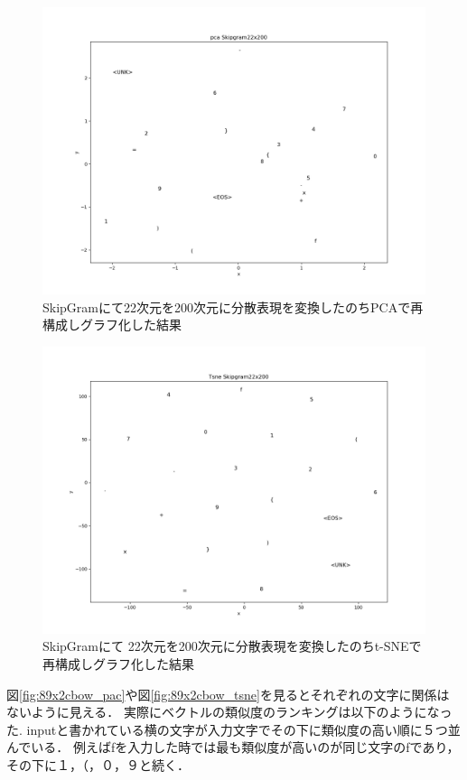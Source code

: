 \documentclass[a4j,11pt,report]{jsbook}
\begin{document}
\begin{center}
  \begin{figure}[H]
    \centering
    \includegraphics[width=0.8\linewidth]{image/pca_skipgram.png}
    \caption{SkipGramにて22次元を200次元に分散表現を変換したのちPCAで再構成しグラフ化した結果}
    \label{fig:22x2_skippca}
  \end{figure}
\end{center}


\begin{center}
  \begin{figure}[H]
    \centering
    \includegraphics[width=0.8\linewidth]{image/tsne_skipgram.png}
    \caption{SkipGramにて 22次元を200次元に分散表現を変換したのちt-SNEで再構成しグラフ化した結果}
    \label{fig:22x2skip_tsne}
  \end{figure}
\end{center}

図\ref{fig:89x2cbow_pac}や図\ref{fig:89x2cbow_tsne}を見るとそれぞれの文字に関係はないように見える．
実際にベクトルの類似度のランキングは以下のようになった.
inputと書かれている横の文字が入力文字でその下に類似度の高い順に５つ並んでいる．
例えばfを入力した時では最も類似度が高いのが同じ文字のfであり，その下に１，（，０，９と続く．
\begin{multicols}{2}
  \begin{quote}
  \end{quote}
\end{multicols}
\end{document}
